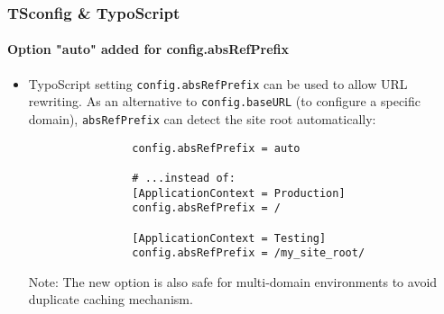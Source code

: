 \begin{frame}[fragile]
	\frametitle{TSconfig \& TypoScript}
	\framesubtitle{Option "auto" added for config.absRefPrefix}

	\begin{itemize}
		\item TypoScript setting \texttt{config.absRefPrefix} can be used to allow URL
			rewriting. As an alternative to \texttt{config.baseURL} (to configure a specific
			domain), \texttt{absRefPrefix} can detect the site root automatically:

			\begin{lstlisting}
				config.absRefPrefix = auto

				# ...instead of:
				[ApplicationContext = Production]
				config.absRefPrefix = /

				[ApplicationContext = Testing]
				config.absRefPrefix = /my_site_root/
			\end{lstlisting}

		\smaller
			Note: The new option is also safe for multi-domain environments to avoid
			duplicate caching mechanism.
		\normalsize

	\end{itemize}

\end{frame}


